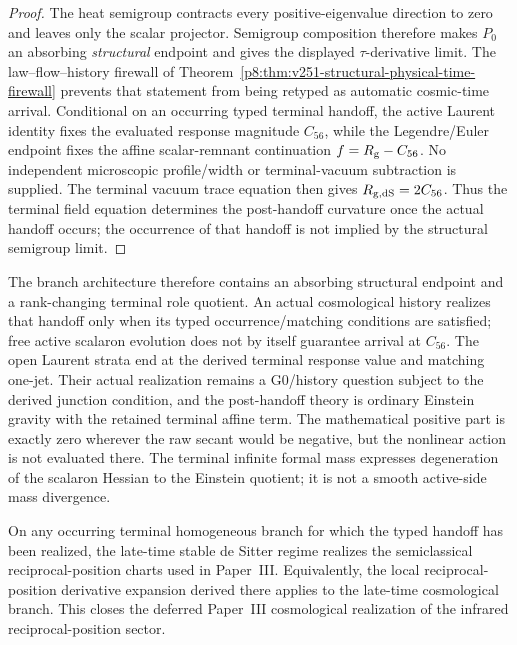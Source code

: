 \documentclass[12pt,a4paper]{article}
\begin{document}
\begin{proof}
The heat semigroup contracts every positive-eigenvalue direction to zero and
leaves only the scalar projector.  Semigroup composition therefore makes
\(P_0\) an absorbing \emph{structural} endpoint and gives the displayed
\(\tau\)-derivative limit.  The law--flow--history firewall of
Theorem~\ref{p8:thm:v251-structural-physical-time-firewall} prevents that
statement from being retyped as automatic cosmic-time arrival.  Conditional on an occurring typed terminal handoff, the active Laurent
identity fixes the evaluated response magnitude \(C_{56}\), while the
Legendre/Euler endpoint fixes the affine scalar-remnant continuation
\(f=R_{\rm g}-C_{56}\).  No independent microscopic profile/width or
terminal-vacuum subtraction is supplied.  The terminal vacuum trace equation
then gives \(R_{\rm g,dS}=2C_{56}\).  Thus the terminal field equation
determines the post-handoff curvature once the actual handoff occurs; the
occurrence of that handoff is not implied by the structural semigroup limit.
\end{proof}

The branch architecture therefore contains an absorbing structural endpoint
and a rank-changing terminal role quotient.  An actual cosmological history
realizes that handoff only when its typed occurrence/matching conditions are
satisfied; free active scalaron evolution does not by itself guarantee arrival
at \(C_{56}\).  The open Laurent strata end at the derived terminal response value and
matching one-jet.  Their actual realization remains a G0/history question subject to the
derived junction condition, and the post-handoff theory is ordinary Einstein
gravity with the retained terminal affine term.  The mathematical positive part is exactly zero wherever the raw secant
would be negative, but the nonlinear action is not evaluated there.  The
terminal infinite formal mass expresses degeneration of the scalaron Hessian to
the Einstein quotient; it is not a smooth active-side mass divergence.

\begin{corollary}
\label{p8:cor:p3_ir_realized}
On any occurring terminal homogeneous branch for which the typed handoff has
been realized, the late-time stable de Sitter regime realizes the semiclassical
reciprocal-position charts used in Paper~III. Equivalently, the local reciprocal-position derivative expansion derived there applies to the late-time cosmological branch. This closes the deferred Paper~III cosmological realization of the infrared reciprocal-position sector.
\end{corollary}
\end{document}
